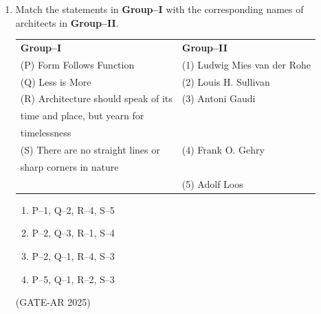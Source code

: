 \documentclass[a4paper,10pt]{article}
\begin{document}
\begin{enumerate}
\item Match the statements in \textbf{Group–I} with the corresponding names of architects in \textbf{Group–II}. \\
\begin{tabular}{ l l }
\textbf{Group–I} & \textbf{Group–II} \\
(P) Form Follows Function & (1) Ludwig Mies van der Rohe \\
(Q) Less is More & (2) Louis H. Sullivan \\
(R) Architecture should speak of its & (3) Antoni Gaudi \\
time and place, but yearn for & \\
timelessness & \\
(S) There are no straight lines or & (4) Frank O. Gehry \\
sharp corners in nature & \\
& (5) Adolf Loos \\
\end{tabular}
\begin{multicols}{2}
\begin{enumerate}
    \item P–1, Q–2, R–4, S–5
    \item P–2, Q–3, R–1, S–4
    \item P–2, Q–1, R–4, S–3
    \item P–5, Q–1, R–2, S–3
\end{enumerate}
\end{multicols}
\hfill (GATE-AR 2025)


\end{enumerate}
\end{document}
